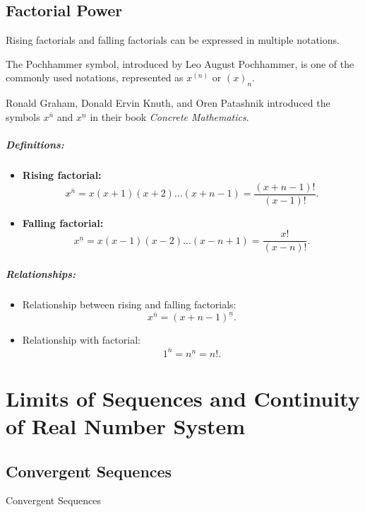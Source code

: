 \documentclass[11pt]{../../TexTemplate/elegantbook}
\begin{document}
\section{Factorial Power}
\begin{definition}
    Rising factorials and falling factorials can be expressed in multiple notations.

    The Pochhammer symbol, introduced by Leo August Pochhammer, is one of the commonly used notations, 
    represented as \( x^{(n)} \) or \( (x)_n \).

    Ronald Graham, Donald Ervin Knuth, and Oren Patashnik introduced the symbols 
    \( x^{\bar{n}} \) and \( x^{\underline{n}} \) in their book \textit{Concrete Mathematics}.

    \paragraph{Definitions:}
    \begin{itemize}
        \item \textbf{Rising factorial:}
        \[
        x^{\bar{n}} = x(x+1)(x+2)\dots(x+n-1) = \frac{(x+n-1)!}{(x-1)!}.
        \]
        \item \textbf{Falling factorial:}
        \[
        x^{\underline{n}} = x(x-1)(x-2)\dots(x-n+1) = \frac{x!}{(x-n)!}.
        \]
    \end{itemize}

    \paragraph{Relationships:}
    \begin{itemize}
        \item Relationship between rising and falling factorials:
        \[
        x^{\bar{n}} = (x+n-1)^{\underline{n}}.
        \]
        \item Relationship with factorial:
        \[
        1^{\bar{n}} = n^{\underline{n}} = n!.
        \]
    \end{itemize}
\end{definition}

\chapter{Limits of Sequences and Continuity of Real Number System} 
\section{Convergent Sequences}
\begin{leftbarTitle}{Convergent Sequences}\end{leftbarTitle}
\end{document}
